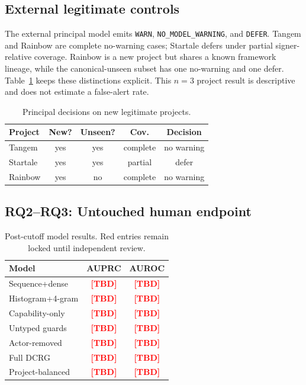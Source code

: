 \documentclass[conference]{IEEEtran}
\newcommand{\code}[1]{\texttt{#1}}
\newcommand{\pending}[1]{\textcolor{red}{\textbf{[#1]}}}
\newcommand{\FullAUPRC}{\pending{TBD}}
\newcommand{\HistAUPRC}{\pending{TBD}}
\newcommand{\SequenceAUPRC}{\pending{TBD}}
\newcommand{\CapabilityAUPRC}{\pending{TBD}}
\newcommand{\UntypedAUPRC}{\pending{TBD}}
\newcommand{\ActorRemovedAUPRC}{\pending{TBD}}
\newcommand{\ProjectBalancedAUPRC}{\pending{TBD}}
\newcommand{\FullAUROC}{\pending{TBD}}
\newcommand{\HistAUROC}{\pending{TBD}}
\newcommand{\SequenceAUROC}{\pending{TBD}}
\newcommand{\CapabilityAUROC}{\pending{TBD}}
\newcommand{\UntypedAUROC}{\pending{TBD}}
\newcommand{\ActorRemovedAUROC}{\pending{TBD}}
\newcommand{\ProjectBalancedAUROC}{\pending{TBD}}
\begin{document}
\subsection{External legitimate controls}

The external principal model emits \ExternalWarn{} \code{WARN}, \ExternalNoWarning{}
\code{NO\_MODEL\_WARNING}, and \ExternalDefer{} \code{DEFER}. Tangem and Rainbow are complete
no-warning cases; Startale defers under partial
signer-relative coverage. Rainbow is a new project but shares a known framework lineage, while the
canonical-unseen subset has one no-warning and one defer. Table~\ref{tab:external} keeps these
distinctions explicit. This $n=3$ project result is descriptive and does not estimate a false-alert
rate.

\begin{table}[t]
\centering
\caption{Principal decisions on new legitimate projects.}
\label{tab:external}
\small
\begin{tabular}{lcccc}
\toprule
Project & New? & Unseen? & Cov. & Decision \\
\midrule
Tangem & yes & yes & complete & no warning \\
Startale & yes & yes & partial & defer \\
Rainbow & yes & no & complete & no warning \\
\bottomrule
\end{tabular}
\end{table}

\subsection{RQ2--RQ3: Untouched human endpoint}

\begin{table}[t]
\centering
\caption{Post-cutoff model results. Red entries remain locked until independent review.}
\label{tab:final-models}
\small
\begin{tabular}{lcc}
\toprule
Model & AUPRC & AUROC \\
\midrule
Sequence+dense & \SequenceAUPRC & \SequenceAUROC \\
Histogram+4-gram & \HistAUPRC & \HistAUROC \\
Capability-only & \CapabilityAUPRC & \CapabilityAUROC \\
Untyped guards & \UntypedAUPRC & \UntypedAUROC \\
Actor-removed & \ActorRemovedAUPRC & \ActorRemovedAUROC \\
Full DCRG & \FullAUPRC & \FullAUROC \\
Project-balanced & \ProjectBalancedAUPRC & \ProjectBalancedAUROC \\
\bottomrule
\end{tabular}
\end{table}
\end{document}
